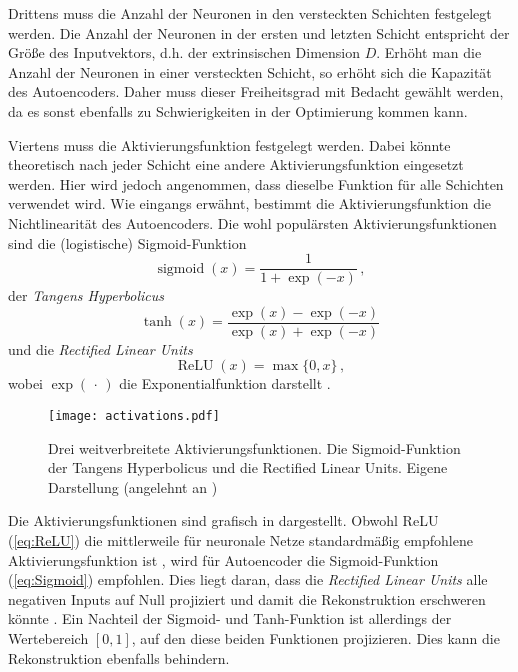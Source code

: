 Drittens muss die Anzahl der Neuronen in den versteckten Schichten festgelegt werden. Die Anzahl
der Neuronen in der ersten und letzten Schicht entspricht der Größe des Inputvektors, d.h. der
extrinsischen Dimension $D$. Erhöht man die Anzahl der Neuronen in einer versteckten Schicht, so
erhöht sich die Kapazität des Autoencoders. Daher muss dieser Freiheitsgrad mit Bedacht gewählt
werden, da es sonst ebenfalls zu Schwierigkeiten in der Optimierung kommen kann.

Viertens muss die Aktivierungsfunktion festgelegt werden. Dabei könnte theoretisch nach jeder
Schicht eine andere Aktivierungsfunktion eingesetzt werden. Hier wird jedoch angenommen, dass
dieselbe Funktion für alle Schichten verwendet wird. Wie eingangs erwähnt, bestimmt die
Aktivierungsfunktion die Nichtlinearität des Autoencoders. Die wohl populärsten
Aktivierungsfunktionen sind die (logistische) Sigmoid-Funktion
\begin{equation}
	\label{eq:Sigmoid}
	\operatorname{sigmoid}(x) = \frac{1}{1 + \exp (-x)} \, ,
\end{equation}
der \textit{Tangens Hyperbolicus}
\begin{equation}
	\label{eq:tanh}
	\operatorname{tanh}(x) = \frac{\exp(x) - \exp(-x)}{\exp(x) + \exp(-x)}
\end{equation}
und die \textit{Rectified Linear Units}
\begin{equation}
	\label{eq:ReLU}
	\operatorname{ReLU}(x) = \max\{0, x\} \, ,
\end{equation}
wobei $\exp(\, \cdot \,)$ die Exponentialfunktion darstellt \parencites[191 -- 195]{Goodfellow.2016}[4]{Charte.2018}.
\begin{figure}[h]
	\centering
	\texttt{[image: activations.pdf]}
	\caption[Drei weitverbreitete Aktivierungsfunktionen.]{Drei weitverbreitete Aktivierungsfunktionen. \captiona Die Sigmoid-Funktion \captionb der Tangens Hyperbolicus und \captionc die Rectified Linear Units. Eigene Darstellung (angelehnt an \textcite[4]{Charte.2018})}
	\label{fig:activations}
\end{figure}
Die Aktivierungsfunktionen sind grafisch in  dargestellt.
Obwohl ReLU (\eqref{eq:ReLU}) die mittlerweile für neuronale Netze standardmäßig empfohlene Aktivierungsfunktion ist \parencite[195]{Goodfellow.2016}, wird für Autoencoder die Sigmoid-Funktion (\eqref{eq:Sigmoid})
empfohlen. Dies liegt daran, dass die \textit{Rectified Linear Units} alle negativen Inputs auf
Null projiziert und damit die Rekonstruktion erschweren könnte \parencite[4]{Charte.2018}. Ein Nachteil der Sigmoid- und Tanh-Funktion ist allerdings der Wertebereich
$[0, 1]$, auf den diese beiden Funktionen projizieren. Dies kann die Rekonstruktion ebenfalls
behindern.
